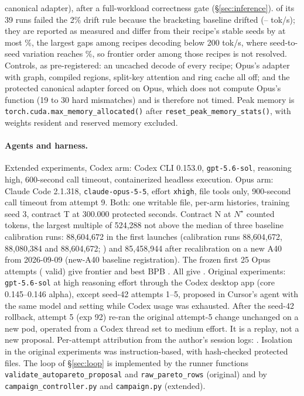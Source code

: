 \documentclass{article}
\begin{document}
canonical adapter), after a full-workload correctness gate (\S\ref{sec:inference}). \CRSixUnstableRuns{} of its 39 runs failed the 2\% drift rule because the bracketing baseline drifted (\CRSixBracketLo--\CRSixBracketHi{} tok/s); they are reported as measured and differ from their recipe's stable seeds by at most \CRSixUnstableMaxDev\%, the largest gaps among recipes decoding below 200 tok/s, where seed-to-seed variation reaches \CRSixSeedCVMax\%, so frontier order among those recipes is not resolved. Controls, as pre-registered: an uncached decode of every recipe; Opus's adapter with graph, compiled regions, split-key attention and ring cache all off; and the protected canonical adapter forced on Opus, which does not compute Opus's function (19 to 30 hard mismatches) and is therefore not timed. Peak memory is \texttt{torch.cuda.max\_memory\_allocated()} after \texttt{reset\_peak\_memory\_stats()}, with weights resident and reserved memory excluded.

\paragraph{Agents and harness.} Extended experiments, Codex arm: Codex CLI 0.153.0, \texttt{gpt-5.6-sol}, reasoning high, 600-second call timeout, containerized headless execution. Opus arm: Claude Code 2.1.318, \texttt{claude-opus-5-5}, effort \texttt{xhigh}, file tools only, 900-second call timeout from attempt 9. Both: one writable file, per-arm histories, training seed 3, contract T at 300.000 protected seconds. Contract N at $N^\star$ counted tokens, the largest multiple of 524,288 not above the median of three baseline calibration runs: 88,604,672 in the first launches (calibration runs 88,604,672, 88,080,384 and 88,604,672; ) and 85,458,944 after recalibration on a new A40 from 2026-09-09 (new-A40 baseline registration). The frozen first 25 Opus attempts (\CROpValidFrozen{} valid) give frontier \CROpFrontierFrozen{} and best BPB \CROpBestFrozen. All \CROpAttempts{} give \CROpFrontierExtended. Original experiments: \texttt{gpt-5.6-sol} at high reasoning effort through the Codex desktop app (core 0.145--0.146 alpha), except seed-42 attempts 1--5, proposed in Cursor's agent with the same model and setting while Codex usage was exhausted. After the seed-42 rollback, attempt 5 (exp 92) re-ran the original attempt-5 change unchanged on a new pod, operated from a Codex thread set to medium effort. It is a replay, not a new proposal. Per-attempt attribution from the author's session logs: . Isolation in the original experiments was instruction-based, with hash-checked protected files. The loop of \S\ref{sec:loop} is implemented by the runner functions \texttt{validate\_autopareto\_proposal} and \texttt{raw\_pareto\_rows} (original) and by \texttt{campaign\_controller.py} and \texttt{campaign.py} (extended).
\end{document}
